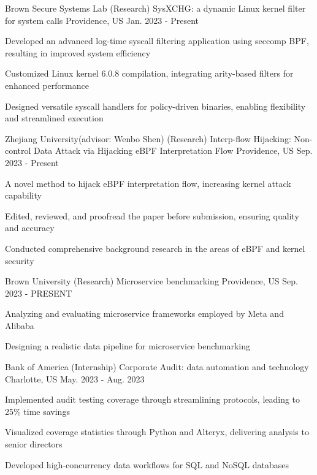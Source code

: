 \begin{cventries}

  \cventry
    {Brown Secure Systems Lab}
    {(Research) SysXCHG: a dynamic Linux kernel filter for system calls}
    {Providence, US}
    {Jan. 2023 - Present}
    {
      \begin{cvitems}
        \item {Developed an advanced log-time syscall filtering application using seccomp BPF, resulting in improved system efficiency}
        \item {Customized Linux kernel 6.0.8 compilation, integrating arity-based filters for enhanced performance}
        \item {Designed versatile syscall handlers for policy-driven binaries, enabling flexibility and streamlined execution}      
      \end{cvitems}
    }
  
  \cventry
    {Zhejiang University(advisor: Wenbo Shen)}
    {(Research) Interp-flow Hijacking: Non-control Data Attack via Hijacking eBPF Interpretation Flow} 
    {Providence, US}
    {Sep. 2023 - Present}
    {
      \begin{cvitems}
        \item {A novel method to hijack eBPF interpretation flow, increasing kernel attack capability}
        \item {Edited, reviewed, and proofread the paper before submission, ensuring quality and accuracy}
        \item {Conducted comprehensive background research in the areas of eBPF and kernel security}
      \end{cvitems}
    }


  \cventry
    {Brown University}
    {(Research) Microservice benchmarking}
    {Providence, US}
    {Sep. 2023 - PRESENT}
    {
      \begin{cvitems}
        \item {Analyzing and evaluating microservice frameworks employed by Meta and Alibaba}
        \item {Designing a realistic data pipeline for microservice benchmarking}
      \end{cvitems}
    }

  \cventry
    {Bank of America}
    {(Internship) Corporate Audit: data automation and technology}
    {Charlotte, US}
    {May. 2023 - Aug. 2023}
    {
      \begin{cvitems}
        \item {Implemented audit testing coverage through streamlining protocols, leading to 25\% time savings}
        \item {Visualized coverage statistics through Python and Alteryx, delivering analysis to senior directors}
        \item {Developed high-concurrency data workflows for SQL and NoSQL databases}
      \end{cvitems}
    }


\end{cventries}
